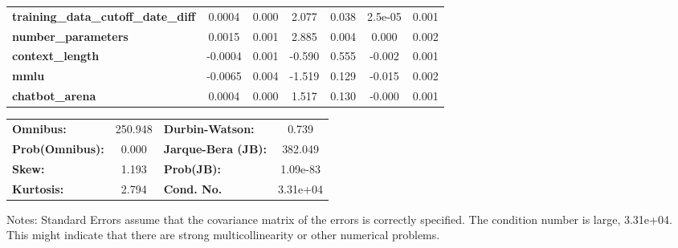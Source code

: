 \begin{center}
\begin{tabular}{lcccccc}
\textbf{training\_data\_cutoff\_date\_diff} &       0.0004  &        0.000     &     2.077  &         0.038        &      2.5e-05    &        0.001     \\
\textbf{number\_parameters}                 &       0.0015  &        0.001     &     2.885  &         0.004        &        0.000    &        0.002     \\
\textbf{context\_length}                    &      -0.0004  &        0.001     &    -0.590  &         0.555        &       -0.002    &        0.001     \\
\textbf{mmlu}                               &      -0.0065  &        0.004     &    -1.519  &         0.129        &       -0.015    &        0.002     \\
\textbf{chatbot\_arena}                     &       0.0004  &        0.000     &     1.517  &         0.130        &       -0.000    &        0.001     \\
\bottomrule
\end{tabular}
\begin{tabular}{lclc}
\textbf{Omnibus:}       & 250.948 & \textbf{  Durbin-Watson:     } &    0.739  \\
\textbf{Prob(Omnibus):} &   0.000 & \textbf{  Jarque-Bera (JB):  } &  382.049  \\
\textbf{Skew:}          &   1.193 & \textbf{  Prob(JB):          } & 1.09e-83  \\
\textbf{Kurtosis:}      &   2.794 & \textbf{  Cond. No.          } & 3.31e+04  \\
\bottomrule
\end{tabular}
\end{center}

Notes: \newline
 [1] Standard Errors assume that the covariance matrix of the errors is correctly specified. \newline
 [2] The condition number is large, 3.31e+04. This might indicate that there are \newline
 strong multicollinearity or other numerical problems.